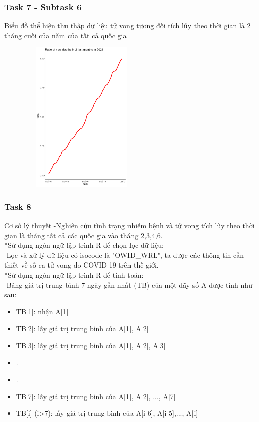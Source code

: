 \documentclass[english,10pt,table]{beamer}
\begin{document}
{
    \frametitle{Task 7 - Subtask 6}
    \begin{block}{Biểu đồ thể hiện thu thập dữ liệu tử vong tương đối tích lũy theo thời gian là 2 tháng cuối của năm của tất cả quốc gia}
    \begin{figure}[H]
		\centering
		\includegraphics[height=7.3cm,width=6cm]{images/7.6.2.png}
	\end{figure}
    \end{block}
}
\frame
{
    \frametitle{Task 8}
    \begin{block}{Cơ sở lý thuyết}
    -Nghiên cứu tình trạng nhiễm bệnh và tử vong tích lũy theo thời gian là tháng tất cả các quốc gia vào tháng 2,3,4,6.\\

        *Sử dụng ngôn ngữ lập trình R để chọn lọc dữ liệu:\\

        -Lọc và xử lý dữ liệu có isocode là "OWID\_WRL", ta được các thông tin cần thiết về số ca tử vong do COVID-19 trên thế giới.\\

        *Sử dụng ngôn ngữ lập trình R để tính toán:\\

        -Bảng giá trị trung bình 7 ngày gần nhất (TB) của một dãy số A được tính như sau:\\
        \begin{itemize}
            \item TB[1]: nhận A[1]\\
            \item TB[2]: lấy giá trị trung bình của A[1], A[2]\\
            \item TB[3]: lấy giá trị trung bình của A[1], A[2], A[3]\\
            \item .\\
            \item .\\
            \item TB[7]: lấy giá trị trung bình của A[1], A[2], ..., A[7]\\
            \item TB[i] (i>7): lấy giá trị trung bình của A[i-6], A[i-5],..., A[i]\\
        \end{itemize}
    \end{block}
}
\end{document}
